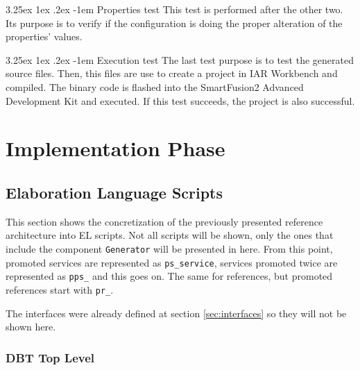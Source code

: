 \documentclass[11pt]{report}
\makeatletter
\renewcommand\paragraph{\@startsection{paragraph}{5}{\z@}%
	{3.25ex \@plus1ex \@minus.2ex}%
	{-1em}%
	{\normalfont\normalsize\bfseries}}
\makeatother
\begin{document}
	\paragraph{Properties test} This test is performed after the other two. Its purpose is to verify if the configuration is doing the proper alteration of the properties' values.
	
	\paragraph{Execution test} The last test purpose is to test the generated source files. Then, this files are use to create a project in IAR Workbench and compiled. The binary code is flashed into the SmartFusion2 Advanced Development Kit and executed. If this test succeeds, the project is also successful. 

\chapter{Implementation Phase}

	\section{Elaboration Language Scripts}
	
	\par This section shows the concretization of the previously presented reference architecture into EL scripts. Not all scripts will be shown, only the ones that include the component \texttt{Generator} will be presented in here. From this point, promoted services are represented as \texttt{ps\_service}, services promoted twice are represented as \texttt{pps\_} and this goes on. The same for references, but promoted references start with \texttt{pr\_}.
	\par The interfaces were already defined at section \ref{sec:interfaces} so they will not be shown here.
	
	\subsection*{DBT Top Level}
	
\end{document}
